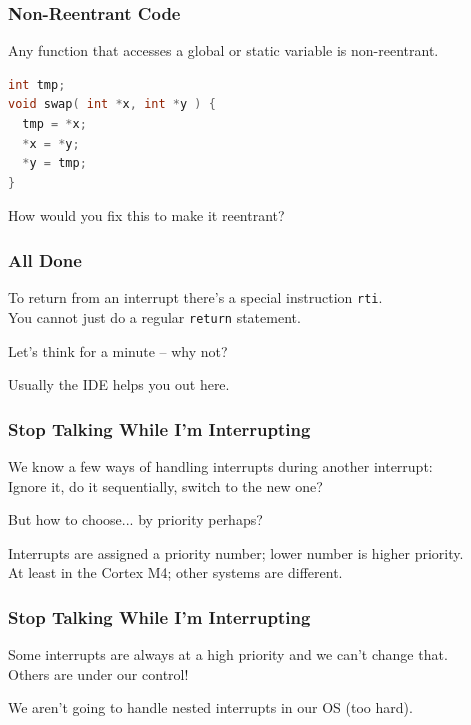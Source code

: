 \begin{frame}[fragile]
\frametitle{Non-Reentrant Code}

Any function that accesses a global or static variable is non-reentrant.

\begin{lstlisting}[language=C]
int tmp;
void swap( int *x, int *y ) {
  tmp = *x;
  *x = *y;
  *y = tmp; 
}
\end{lstlisting}

How would you fix this to make it reentrant? 

\end{frame}

\begin{frame}
\frametitle{All Done}

To return from an interrupt there's a special instruction \texttt{rti}.\\
\quad You cannot just do a regular \texttt{return} statement.

Let's think for a minute -- why not?

Usually the IDE helps you out here.

\end{frame}

\begin{frame}
\frametitle{Stop Talking While I'm Interrupting}

We know a few ways of handling interrupts during another interrupt:\\
\quad Ignore it, do it sequentially, switch to the new one?

But how to choose... by priority perhaps?

Interrupts are assigned a priority number; lower number is higher priority.\\
\quad At least in the Cortex M4; other systems are different.

\end{frame}

\begin{frame}
\frametitle{Stop Talking While I'm Interrupting}

Some interrupts are always at a high priority and we can't change that.\\
\quad Others are under our control!

We aren't going to handle nested interrupts in our OS (too hard).

\end{frame}

